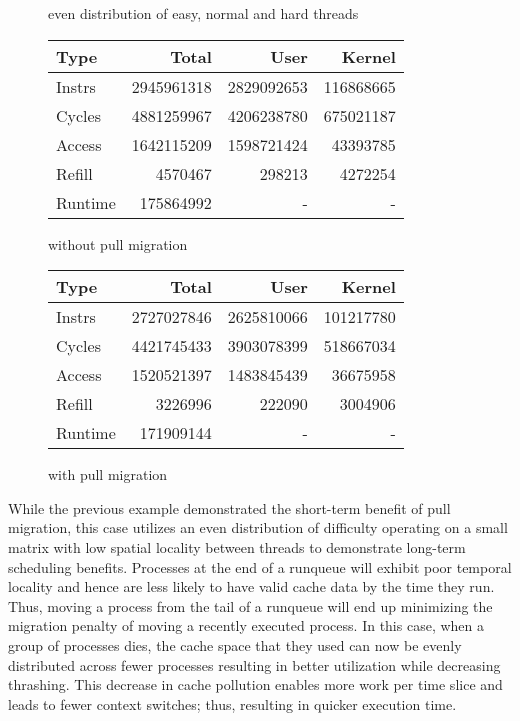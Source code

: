 \documentclass[11pt]{article}
\begin{document}
\begin{figure*}[!h]
	\caption{even distribution of easy, normal and hard threads}
	\centering
	\begin{subtable}[b]{.48\linewidth}
		\centering                 
		\begin{tabular}{ l|rrr }
			Type    & Total      & User       & Kernel    \\
			\hline
			Instrs  & 2945961318 & 2829092653 & 116868665 \\ 
			Cycles  & 4881259967 & 4206238780 & 675021187 \\ 
			Access  & 1642115209 & 1598721424 & 43393785  \\ 
			Refill  & 4570467    & 298213     & 4272254   \\ 
			Runtime & 175864992  & -          & -         \\
			\hline
		\end{tabular}
		\caption{without pull migration}    
	\end{subtable}
	\hfill
	\begin{subtable}[b]{.48\linewidth}
		\centering
		\begin{tabular}{ l|rrr }
			Type    & Total      & User       & Kernel    \\
			\hline
			Instrs  & 2727027846 & 2625810066 & 101217780 \\ 
			Cycles  & 4421745433 & 3903078399 & 518667034 \\ 
			Access  & 1520521397 & 1483845439 & 36675958  \\ 
			Refill  & 3226996    & 222090     & 3004906   \\ 
			Runtime & 171909144  & -          & -         \\
			\hline
		\end{tabular}
		\caption{with pull migration}
	\end{subtable}
\end{figure*}

While the previous example demonstrated the short-term benefit of pull migration, this case utilizes an even distribution of difficulty operating on a small matrix with low spatial locality between threads to demonstrate long-term scheduling benefits.  Processes at the end of a runqueue will exhibit poor temporal locality and hence are less likely to have valid cache data by the time they run.  Thus, moving a process from the tail of a runqueue will end up minimizing the migration penalty of moving a recently executed process.  In this case, when a group of processes dies, the cache space that they used can now be evenly distributed across fewer processes resulting in better utilization while decreasing thrashing.  This decrease in cache pollution enables more work per time slice and leads to fewer context switches; thus, resulting in quicker execution time.
\end{document}
